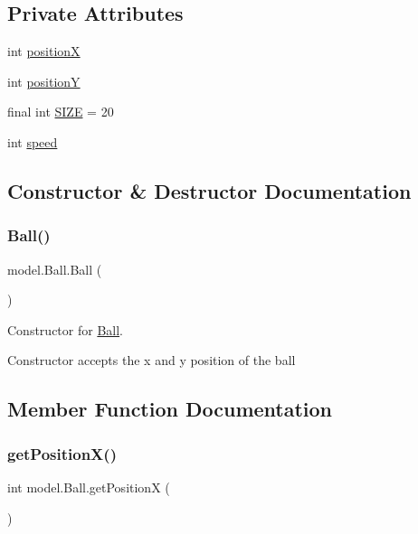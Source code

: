 \subsection*{Private Attributes}
\begin{DoxyCompactItemize}
\item 
int \hyperlink{classmodel_1_1_ball_a706c12dfbaabd03b8423ff2bdde0f5c9}{positionX}
\item 
int \hyperlink{classmodel_1_1_ball_aac5d95f10dd849f8cea43c34300d9649}{positionY}
\item 
final int \hyperlink{classmodel_1_1_ball_ad9a73bce4f016c2bd11fb037bac835c7}{S\+I\+ZE} = 20
\item 
int \hyperlink{classmodel_1_1_ball_a6952fd152ab74c481570678ba240e471}{speed}
\end{DoxyCompactItemize}


\subsection{Constructor \& Destructor Documentation}
\hypertarget{classmodel_1_1_ball_a525ba73a7ce62c810a501d6194402cfc}{}\label{classmodel_1_1_ball_a525ba73a7ce62c810a501d6194402cfc} 
\subsubsection{\texorpdfstring{Ball()}{Ball()}}
{\footnotesize\ttfamily model.\+Ball.\+Ball (\begin{DoxyParamCaption}{ }\end{DoxyParamCaption})}



Constructor for \hyperlink{classmodel_1_1_ball}{Ball}. 

Constructor accepts the x and y position of the ball 

\subsection{Member Function Documentation}
\hypertarget{classmodel_1_1_ball_ad6a8f2229d4bdb3dd755443000eeacdf}{}\label{classmodel_1_1_ball_ad6a8f2229d4bdb3dd755443000eeacdf} 
\subsubsection{\texorpdfstring{get\+Position\+X()}{getPositionX()}}
{\footnotesize\ttfamily int model.\+Ball.\+get\+PositionX (\begin{DoxyParamCaption}{ }\end{DoxyParamCaption})}



